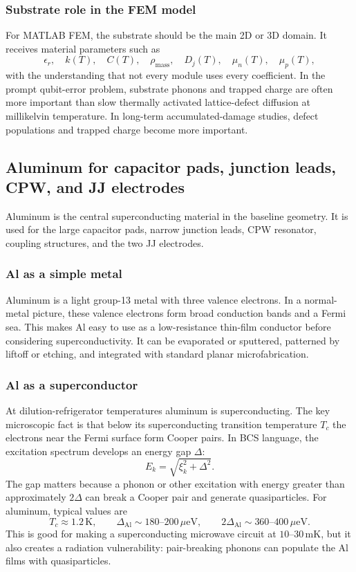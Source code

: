 \documentclass[11pt]{article}
\begin{document}
\subsubsection{Substrate role in the FEM model}
For MATLAB FEM, the substrate should be the main 2D or 3D domain. It receives material parameters such as
\begin{equation}
    \epsilon_r,\quad k(T),\quad C(T),\quad \rho_{\mathrm{mass}},\quad D_j(T),\quad \mu_n(T),\quad \mu_p(T),
\end{equation}
with the understanding that not every module uses every coefficient. In the prompt qubit-error problem, substrate phonons and trapped charge are often more important than slow thermally activated lattice-defect diffusion at millikelvin temperature. In long-term accumulated-damage studies, defect populations and trapped charge become more important.

\subsection{Aluminum for capacitor pads, junction leads, CPW, and JJ electrodes}
Aluminum is the central superconducting material in the baseline geometry. It is used for the large capacitor pads, narrow junction leads, CPW resonator, coupling structures, and the two JJ electrodes.

\subsubsection{Al as a simple metal}
Aluminum is a light group-13 metal with three valence electrons. In a normal-metal picture, these valence electrons form broad conduction bands and a Fermi sea. This makes Al easy to use as a low-resistance thin-film conductor before considering superconductivity. It can be evaporated or sputtered, patterned by liftoff or etching, and integrated with standard planar microfabrication.

\subsubsection{Al as a superconductor}
At dilution-refrigerator temperatures aluminum is superconducting. The key microscopic fact is that below its superconducting transition temperature $T_c$ the electrons near the Fermi surface form Cooper pairs. In BCS language, the excitation spectrum develops an energy gap $\Delta$:
\begin{equation}
    E_k = \sqrt{\xi_k^2+\Delta^2}.
\end{equation}
The gap matters because a phonon or other excitation with energy greater than approximately $2\Delta$ can break a Cooper pair and generate quasiparticles. For aluminum, typical values are
\begin{equation}
    T_c \approx 1.2\,\mathrm{K},
    \qquad
    \Delta_{\mathrm{Al}} \sim 180\text{--}200\,\mu\mathrm{eV},
    \qquad
    2\Delta_{\mathrm{Al}} \sim 360\text{--}400\,\mu\mathrm{eV}.
\end{equation}
This is good for making a superconducting microwave circuit at $10$--$30\,\mathrm{mK}$, but it also creates a radiation vulnerability: pair-breaking phonons can populate the Al films with quasiparticles.
\end{document}

